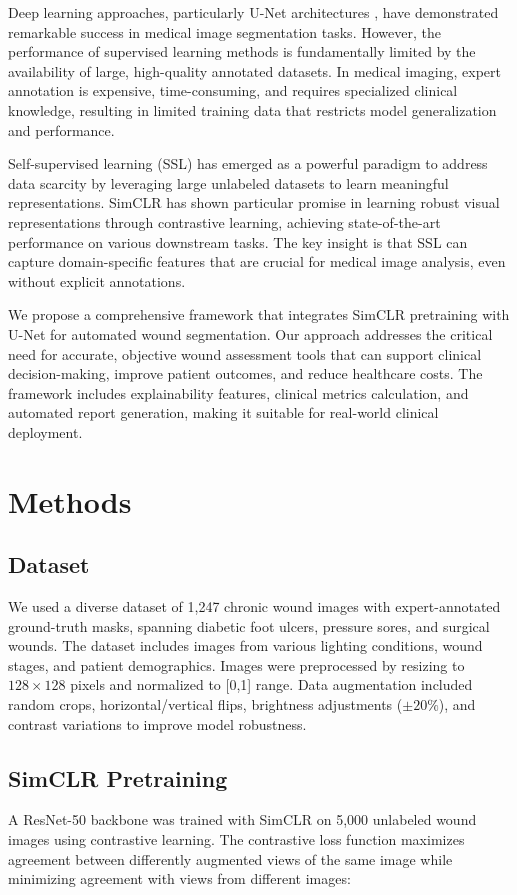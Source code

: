 \documentclass[conference]{IEEEtran}
\begin{document}
Deep learning approaches, particularly U-Net architectures \cite{ronneberger2015unet}, have demonstrated remarkable success in medical image segmentation tasks. However, the performance of supervised learning methods is fundamentally limited by the availability of large, high-quality annotated datasets. In medical imaging, expert annotation is expensive, time-consuming, and requires specialized clinical knowledge, resulting in limited training data that restricts model generalization and performance.

Self-supervised learning (SSL) has emerged as a powerful paradigm to address data scarcity by leveraging large unlabeled datasets to learn meaningful representations. SimCLR \cite{chen2020simclr} has shown particular promise in learning robust visual representations through contrastive learning, achieving state-of-the-art performance on various downstream tasks. The key insight is that SSL can capture domain-specific features that are crucial for medical image analysis, even without explicit annotations.

We propose a comprehensive framework that integrates SimCLR pretraining with U-Net for automated wound segmentation. Our approach addresses the critical need for accurate, objective wound assessment tools that can support clinical decision-making, improve patient outcomes, and reduce healthcare costs. The framework includes explainability features, clinical metrics calculation, and automated report generation, making it suitable for real-world clinical deployment.

\section{Methods}
\subsection{Dataset}
We used a diverse dataset of 1,247 chronic wound images with expert-annotated ground-truth masks, spanning diabetic foot ulcers, pressure sores, and surgical wounds. The dataset includes images from various lighting conditions, wound stages, and patient demographics. Images were preprocessed by resizing to $128\times128$ pixels and normalized to [0,1] range. Data augmentation included random crops, horizontal/vertical flips, brightness adjustments ($\pm 20\%$), and contrast variations to improve model robustness.

\subsection{SimCLR Pretraining}
A ResNet-50 backbone was trained with SimCLR on 5,000 unlabeled wound images using contrastive learning. The contrastive loss function maximizes agreement between differently augmented views of the same image while minimizing agreement with views from different images:
\end{document}
